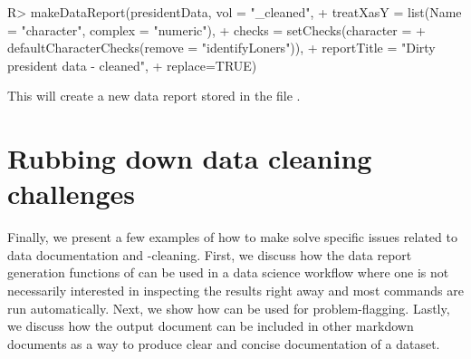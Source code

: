 \documentclass[article,shortnames]{jss}
\begin{document}
\begin{Schunk}
\begin{Sinput}
R> makeDataReport(presidentData, vol = "_cleaned", 
+    treatXasY = list(Name = "character", complex = "numeric"),
+    checks = setChecks(character = 
+    defaultCharacterChecks(remove = "identifyLoners")),
+    reportTitle = "Dirty president data - cleaned",
+    replace=TRUE)
\end{Sinput}
\end{Schunk}

This will create a new data report stored in the file .  

\section{Rubbing down data cleaning challenges}
\label{sec:specificExamples}

Finally, we present a few examples of how to make 
solve specific issues related to data documentation and -cleaning. First, we discuss how the data report generation functions of  can be used in a data science workflow where one is not necessarily interested in inspecting the results right away and most commands are run automatically. Next, we show how  can be used for problem-flagging. Lastly, we discuss how the
 output document can be included in other  markdown
documents as a way to produce clear and concise documentation of a
dataset.
\end{document}
